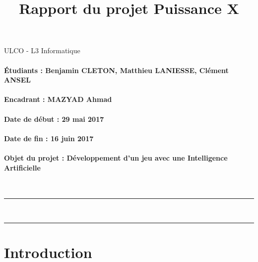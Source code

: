 \documentclass[a4paper,oneside]{article}
\title{Rapport du projet Puissance X}
\author{}
\date{}
\begin{document}

\thispagestyle{empty}

\Large
ULCO - L3 Informatique

\vfill 

\Huge
\begin{center}
\@title
\end{center}

\normalsize

\vfill 

\paragraph{Étudiants : Benjamin CLETON, Matthieu LANIESSE, Clément ANSEL }

\paragraph{Encadrant : MAZYAD Ahmad}

\paragraph{Date de début : 29 mai 2017}

\paragraph{Date de fin : 16 juin 2017}

\paragraph{Objet du projet : Développement d'un jeu avec une Intelligence Artificielle}

~

\vfill 

\noindent\rule{\linewidth}{0.5pt}

\tableofcontents

~\\
\noindent\rule{\linewidth}{0.5pt}

\clearpage


\section{Introduction}
\end{document}

